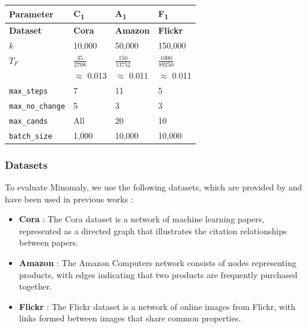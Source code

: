 \documentclass[pdflatex,sn-mathphys-num]{sn-jnl}%
\renewenvironment{table}[1][]%
{\tableorg[#1]%
\tablebodyfont%
\renewcommand\footnotetext[2][]{{\removelastskip\vskip0pt%
\let\tablebodyfont\tablefootnotefont%
\hskip0pt\if!##1!\else{\smash{$^{##1}$}}\fi##2\par}}%
}{\endtableorg}
\theoremstyle{thmstyleone}%
\theoremstyle{thmstyletwo}%
\theoremstyle{thmstylethree}%
\begin{document}
\begin{table}[H]
\centering
\caption{Minomaly Hyperparameters Configurations}
\scriptsize
\label{tab:all_minomaly_hyperparameters}
\begin{tabular}{|l|l|l|l|}
\hline
\textbf{Parameter} & \textbf{C\textsubscript{1}} & \textbf{A\textsubscript{1}} & \textbf{F\textsubscript{1}} \\ \hline
\textbf{Dataset}   & \textbf{Cora}           & \textbf{Amazon}         & \textbf{Flickr}         \\ \hline
\boldmath$k$       & 10,000         & 50,000         & 150,000        \\ \hline
\boldmath$T_F$     & $\frac{35}{2708}$ & $\frac{150}{13752}$ & $\frac{1000}{89250}$ \\
                   & $\approx$ 0.013 & $\approx$ 0.011   & $\approx$ 0.011  \\ \hline
\texttt{max\_steps} & 7             & 11             & 5              \\ \hline
\texttt{max\_no\_change} & 5       & 3              & 3              \\ \hline
\texttt{max\_cands} & All           & 20             & 10             \\ \hline
\texttt{batch\_size} & 1,000         & 10,000         & 10,000         \\ \hline
\end{tabular}
\end{table}

\subsubsection{Datasets}
To evaluate Minomaly, we use the following datasets, which are provided by \cite{NEURIPS2022-acc1ec4a,JMLR:v25:23-0963} and have been used in previous works \cite{chen2020generative,ding2019deep,fan2020anomalydae,gu2024three,yuan2024higherorder}: %

\begin{itemize}
    \item \textbf{Cora} \cite{sen2008collective} : The Cora dataset is a network of machine learning papers, represented as a directed graph that illustrates the citation relationships between papers.
    \item  \textbf{Amazon} \cite{shchur2018pitfalls} :  The Amazon Computers network consists of nodes representing products, with edges indicating that two products are frequently purchased together.
    \item \textbf{Flickr} \cite{zeng2019graphsaint} :  The Flickr dataset is a network of online images from Flickr, with links formed between images that share common properties.
\end{itemize}
\end{document}
